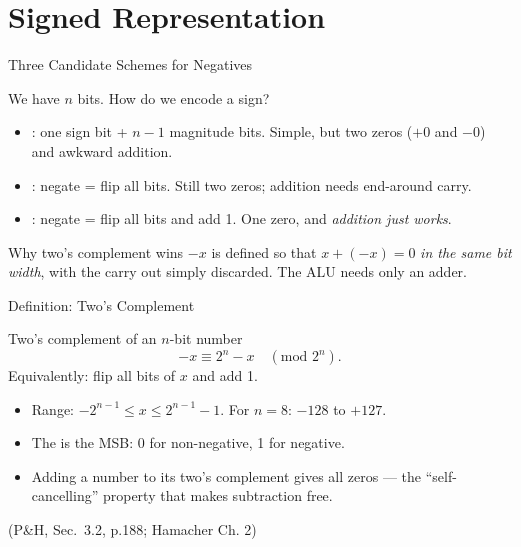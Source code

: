 \documentclass[aspectratio=169]{beamer}
\begin{document}

\section{Signed Representation}

\begin{frame}{Three Candidate Schemes for Negatives}
  \begin{block}{We have $n$ bits. How do we encode a sign?}
    \begin{itemize}
      \item {}: one sign bit + $n-1$ magnitude bits. Simple,
        but two zeros ($+0$ and $-0$) and awkward addition.
      \item {}: negate = flip all bits. Still two zeros;
        addition needs end-around carry.
      \item {}: negate = flip all bits and add 1.
        One zero, and \emph{addition just works}.
    \end{itemize}
  \end{block}
  \begin{exampleblock}{Why two's complement wins}
    $-x$ is defined so that $x + (-x) = 0$ \emph{in the same bit width}, with
    the carry out simply discarded. The ALU needs only an adder.
  \end{exampleblock}
\end{frame}

\begin{frame}{Definition: Two's Complement}
  \begin{block}{Two's complement of an $n$-bit number}
    \[
      -x \equiv 2^n - x \quad (\text{mod } 2^n).
    \]
    Equivalently: flip all bits of $x$ and add 1.
  \end{block}
  \begin{itemize}
    \item Range: $-2^{n-1} \le x \le 2^{n-1}-1$. For $n=8$: $-128$ to $+127$.
    \item The  is the MSB: 0 for non-negative, 1 for negative.
    \item Adding a number to its two's complement gives all zeros --- the
      ``self-cancelling'' property that makes subtraction free.
  \end{itemize}
  (P\&H, Sec.~3.2, p.188; Hamacher Ch. 2)
  \cite{PattersonHennessy2017_computer_organization_design,Hamacher2002_computer_organization}
\end{frame}
\end{document}
